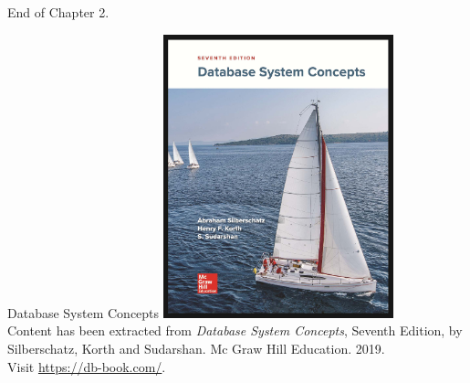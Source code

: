 \documentclass{beamer}
\begin{document}
\begin{frame}{}
    \centering
    \Huge End of Chapter 2.
\end{frame}

\begin{frame}{Database System Concepts}
    \centering
    \includegraphics[width=0.5\textwidth]{figures/book_cover.jpg} \\
    \vspace{5mm}
    {
        \tiny
        Content has been extracted from \textit{Database System Concepts}, Seventh Edition, by Silberschatz, Korth and Sudarshan. Mc Graw Hill Education. 2019.\\
        Visit \url{https://db-book.com/}.\\
    }
\end{frame}
\end{document}
